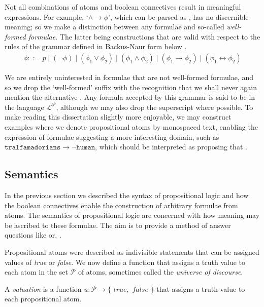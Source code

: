 Not all combinations of atoms and boolean connectives result in meaningful expressions. For example, `$\land \rightarrow \phi$', which can be parsed as , has no discernible meaning; so we make a distinction between any formulae and so-called \textit{well-formed formulae}. The latter being constructions that are valid with respect to the rules of the grammar defined in Backus-Naur form below \cite[p. 33]{Huth_Ryan_2004}.
%
\begin{align}
  \phi ::= p \mid (\neg \phi) \mid (\phi_1 \lor \phi_2) \mid (\phi_1 \land \phi_2) \mid (\phi_1 \rightarrow \phi_2) \mid (\phi_1 \leftrightarrow \phi_2)
\end{align}

We are entirely uninterested in formulae that are not well-formed formulae, and so we drop the `well-formed' suffix with the recognition that we shall never again mention the alternative \cite[p. 33]{Huth_Ryan_2004}. Any formula accepted by this grammar is said to be in the language $\mathcal{L}^\mathcal{P}$, although we may also drop the superscript where possible.
To make reading this dissertation slightly more enjoyable, we may construct examples where we denote propositional atoms by monospaced text, enabling the expression of formulae suggesting a more interesting domain, such as $\texttt{tralfamadorians} \rightarrow \neg \texttt{human}$, which should be interpreted as proposing that .

\subsection{Semantics}
\label{subsection:semantics}
In the previous section we described the syntax of propositional logic and how the boolean connectives enable the construction of arbitrary formulae from atoms. The semantics of propositional logic are concerned with how meaning may be ascribed to these formulae. The aim is to provide a method of answer questions like  or, .

Propositional atoms were described as indivisible statements that can be assigned values of \textit{true} or \textit{false}. We now define a function that assigns a truth value to each atom in the set $\mathcal{P}$ of atoms, sometimes called the \textit{universe of discourse}. 

\begin{definition}
  \label{definition:valuation} 
  A \textit{valuation} is a function \(u : \mathcal{P} \to \{\textit{ true}, \textit{ false }\}\) that assigns a truth value to each propositional atom.
\end{definition}

